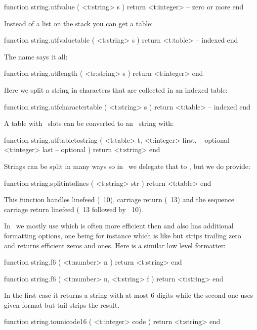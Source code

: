 \starttyping[option=LUA]
function string.utfvalue ( <t:string> s )
    return <t:integer> -- zero or more
end
\stoptyping

Instead of a list on the stack you can get a table:

\starttyping[option=LUA]
function string.utfvaluetable ( <t:string> s )
    return <t:table> -- indexed
end
\stoptyping

The name says it all:

\starttyping[option=LUA]
function string.utflength ( <tr:string> s )
    return <t:integer>
end
\stoptyping

Here we split a string in characters that are collected in an indexed table:

\starttyping[option=LUA]
function string.utfcharactertable ( <t:string> s )
    return <t:table> -- indexed
end
\stoptyping

A table with \UNICODE\ slots can be converted to an \UTF\ string with:

\starttyping[option=LUA]
function string.utftabletostring (
    <t:table>   t,
    <t:integer> first, -- optional
    <t:integer> last   -- optional
)
    return <t:string>
end
\stoptyping

Strings can be split in many ways so in \CONTEXT\ we delegate that to \LUA,
but we do provide:

\starttyping[option=LUA]
function string.splitintolines ( <t:string> str )
    return <t:table>
end
\stoptyping

This function handles linefeed (\ASCII~10), carriage return (\ASCII~13) and the
sequence carriage return linefeed (\ASCII~13 followed by \ASCII~10).

In \CONTEXT\ we mostly use  which is often more
efficient then  and also has additional formatting options,
one being for instance  which is like  but strips trailing zero
and returns efficient zeros and ones. Here is a similar low level formatter:

\starttyping[option=LUA]
function string.f6 ( <t:number> n )
    return <t:string>
end

function string.f6 ( <t:number> n,  <t:string> f )
    return <t:string>
end
\stoptyping

In the first case it returns a string with at most 6 digits while the second one
uses given format but tail strips the result.

\starttyping[option=LUA]
function string.tounicode16 ( <t:integer> code  ) return <t:string> end
\stoptyping

